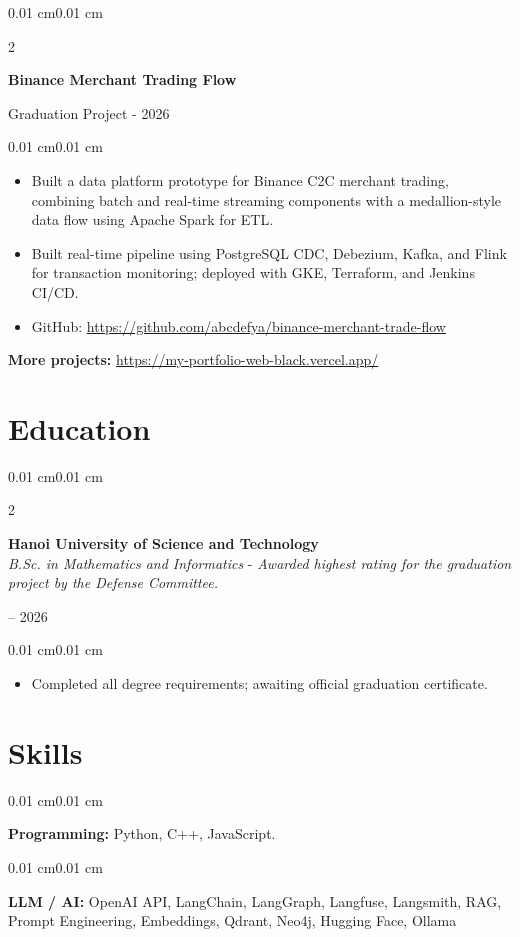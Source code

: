 \documentclass[10pt, letterpaper]{article}
\newenvironment{highlights}{
    \begin{itemize}[
        topsep=0.05 cm,
        parsep=0.05 cm,
        partopsep=0pt,
        itemsep=0pt,
        leftmargin=0.35 cm
    ]
}{
    \end{itemize}
}
\newenvironment{onecolentry}{
    \begin{adjustwidth}{0.01 cm}{0.01 cm}
}{
    \end{adjustwidth}
}
\newenvironment{twocolentry}[2][]{
    \onecolentry
    \def\secondColumn{#2}
    \setcolumnwidth{\fill, 4.3 cm}
    \begin{paracol}{2}
}{
    \switchcolumn \raggedleft \secondColumn
    \end{paracol}
    \endonecolentry
}
\begin{document}
\begin{twocolentry}{Graduation Project - 2026}
    \textbf{Binance Merchant Trading Flow}
\end{twocolentry}

\begin{onecolentry}
\begin{highlights}
    \item Built a data platform prototype for Binance C2C merchant trading, combining batch and real-time streaming components with a medallion-style data flow using Apache Spark for ETL.
    \item Built real-time pipeline using PostgreSQL CDC, Debezium, Kafka, and Flink for transaction monitoring; deployed with GKE, Terraform, and Jenkins CI/CD.
    \item GitHub: \url{https://github.com/abcdefya/binance-merchant-trade-flow}
\end{highlights}
\end{onecolentry}
\textbf{More projects:} \url{https://my-portfolio-web-black.vercel.app/}
\section{Education}

\begin{twocolentry}{2021 -- 2026}
    \textbf{Hanoi University of Science and Technology} \\
    \textit{B.Sc. in Mathematics and Informatics} - \textit{Awarded highest rating for the graduation project by the Defense Committee.}
\end{twocolentry}

\begin{onecolentry}
\begin{highlights}
    \item Completed all degree requirements; awaiting official graduation certificate.
\end{highlights}
\end{onecolentry}

\section{Skills}

\begin{onecolentry}
\textbf{Programming:} Python, C++, JavaScript.
\end{onecolentry}

\begin{onecolentry}
\textbf{LLM / AI:} OpenAI API, LangChain, LangGraph, Langfuse, Langsmith, RAG, Prompt Engineering, Embeddings, Qdrant, Neo4j, Hugging Face, Ollama
\end{onecolentry}
\end{document}
